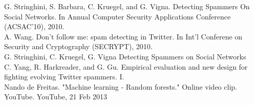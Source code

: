 \documentclass[a4paper, twoside, 12pt]{report}
\begin{document}
\noindent [4] G. Stringhini, S. Barbara, C. Kruegel, and G. Vigna. Detecting Spammers On Social Networks. In Annual Computer Security Applications Conference (ACSAC’10), 2010.\\

\noindent [5] A. Wang. Don’t follow me: spam detecting in Twitter. In Int’l Conferene on Security and Cryptography (SECRYPT), 2010.\\

\noindent [6] G. Stringhini, C. Kruegel, G. Vigna Detecting Spammers on Social Networks\\

\noindent [7] C. Yang, R. Harkreader, and G. Gu. Empirical evaluation and new design for fighting evolving Twitter spammers. I.\\

\noindent [8] Nando de Freitas. "Machine learning - Random forests." Online video clip. YouTube. YouTube, 21 Feb 2013
\end{document}
